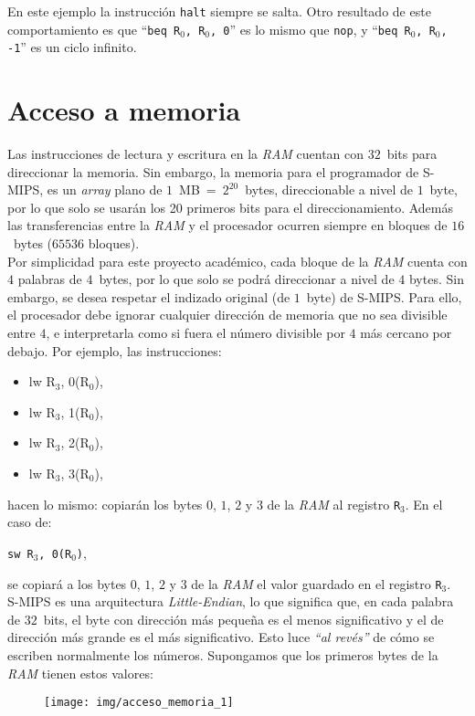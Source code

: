 \documentclass[12pt]{amsart}
\begin{document}
	En este ejemplo la instrucción \texttt{halt} siempre se salta. Otro resultado de este comportamiento es que ``\texttt{beq R$_0$, R$_0$, 0}'' es lo mismo que \texttt{nop}, y ``\texttt{beq R$_0$, R$_0$, -1}'' es un ciclo infinito.
	
	\section{Acceso a memoria}
	
	Las instrucciones de lectura y escritura en la \textit{RAM} cuentan con $32$~bits para direccionar la memoria. Sin embargo, la memoria para el programador de S-MIPS, es un \textit{array} plano de $1$~MB~=~$2^{20}$~bytes, direccionable a nivel de $1$~byte, por lo que solo se usarán los 20 primeros bits para el direccionamiento. Además las transferencias entre la \textit{RAM} y el procesador ocurren siempre en bloques de $16$~bytes ($65536$ bloques).\\
	
	Por simplicidad para este proyecto académico, cada bloque de la \textit{RAM} cuenta con $4$ palabras de $4$~bytes, por lo que solo se podrá direccionar a nivel de $4$ bytes. Sin embargo, se desea respetar el indizado original (de $1$~byte) de S-MIPS. Para ello, el procesador debe ignorar cualquier dirección de memoria que no sea divisible entre $4$, e interpretarla como si fuera el número divisible por $4$ más cercano por debajo. Por ejemplo, las instrucciones:
	\begin{itemize}
		\ttfamily
		\item lw R$_3$, 0(R$_0$)\textrm{,}
		\item lw R$_3$, 1(R$_0$)\textrm{,}
		\item lw R$_3$, 2(R$_0$)\textrm{,}
		\item lw R$_3$, 3(R$_0$)\textrm{,}
	\end{itemize}
	hacen lo mismo: copiarán los bytes $0$, $1$, $2$ y $3$ de la \textit{RAM} al registro \texttt{R$_3$}. En el caso de:
	\begin{itemize}
		\pto \texttt{sw R$_3$, 0(R$_0$)}\textrm{,}
	\end{itemize}
	se copiará a los bytes $0$, $1$, $2$ y $3$ de la \textit{RAM} el valor guardado en el registro \texttt{R$_3$}.\\
	
	S-MIPS es una arquitectura \textit{Little-Endian}, lo que significa que, en cada palabra de $32$~bits, el byte con dirección más pequeña es el menos significativo y el de dirección más grande es el más significativo. Esto luce \textit{``al revés''} de cómo se escriben normalmente los números. Supongamos que los primeros bytes de la \textit{RAM} tienen estos valores:
	\begin{figure}[H]
		\centering
		\texttt{[image: img/acceso\_memoria\_1]}
		\label{fig:accesomemoria1}
	\end{figure}
\end{document}
